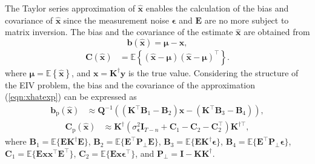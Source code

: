 The Taylor series approximation of $\widehat{\mathbf{x}}$ enables the calculation of the bias and covariance of $\widehat{\mathbf{x}}$ since the measurement noise $\bm{\epsilon}$ and $\mathbf{E}$ are no more subject to matrix inversion. 
The bias and the covariance of the estimate $\widehat{\mathbf{x}}$ are obtained from
\begin{equation}  \mathbf{b} \left(\widehat{\mathbf{x}} \right) = \mathbf{\mu} - \mathbf{x}, \label{eqn:biasdef} \end{equation}
\begin{equation} \begin{aligned} \mathrm{\mathbf{C}} \left( \widehat{\mathbf{\mathbf{x}}} \right) & = \mathbb{E} \left\{ \left( \widehat{\mathbf{x}} - \mathbf{\mu} \right)  \left( \widehat{\mathbf{x}} - \mathbf{\mu} \right)^\top \right\} . \end{aligned} \label{eqn:covdef} \end{equation} 
where $\mathbf{\mu} = \mathbb{E} \left\{ \widehat{\mathbf{x}} \right\}$, and $\mathbf{x} = \mathbf{K}^\dagger \mathbf{y}$ is the true value. 
Considering the structure of the EIV problem, the bias and the covariance of the approximation (\ref{eqn:xhatexp}) can be expressed as
\begin{equation} \begin{aligned} \mathbf{b}_{\mathrm{p}} \left( \widehat{\mathbf{x}} \right) & \approx \mathbf{Q}^{-1} \left(  \left( \mathbf{K}^\top \mathbf{B}_1 - \mathbf{B}_2 \right) \mathbf{x} - \left( \mathbf{K}^\top \mathbf{B}_3 - \mathbf{B}_4 \right) \right), \end{aligned} \label{eqn:biasE} \end{equation}
\begin{equation} \begin{aligned} \mathrm{\mathbf{C}}_{\mathrm{p}} \left( \widehat{\mathbf{x}} \right) & \approx \mathbf{K}^\dagger \left( \sigma_{\bm{\epsilon}}^2 \mathbf{I}_{T-n} + \mathbf{C}_1 - \mathbf{C}_2 - \mathbf{C}_2^\top \right) \mathbf{K}^{\dagger \top}, \end{aligned} \label{eqn:varE} \end{equation}
where $\mathbf{B}_1 = \mathbb{E} \Big\{ \mathbf{E} \mathbf{K}^\dagger \mathbf{E} \Big\}$, $\mathbf{B}_2 = \mathbb{E} \Big\{ \mathbf{E}^\top \mathbf{P}_\perp \mathbf{E} \Big\}$, $\mathbf{B}_3 = \mathbb{E} \Big\{ \mathbf{E} \mathbf{K}^\dagger \bm{\epsilon} \Big\}$, $\mathbf{B}_4 = \mathbb{E} \Big\{ \mathbf{E}^\top \mathbf{P}_\perp \bm{\epsilon} \Big\}$, $\mathbf{C}_1 = \mathbb{E} \Big\{ \mathbf{E} \mathbf{x} \mathbf{x}^\top \mathbf{E}^\top \Big\}$, \linebreak $\mathbf{C}_2 = \mathbb{E} \Big\{ \mathbf{E} \mathbf{x} \bm{\epsilon}^\top \Big\}$, and $\mathbf{P}_\perp = \mathbf{I} - \mathbf{K} \mathbf{K}^\dagger$. 

